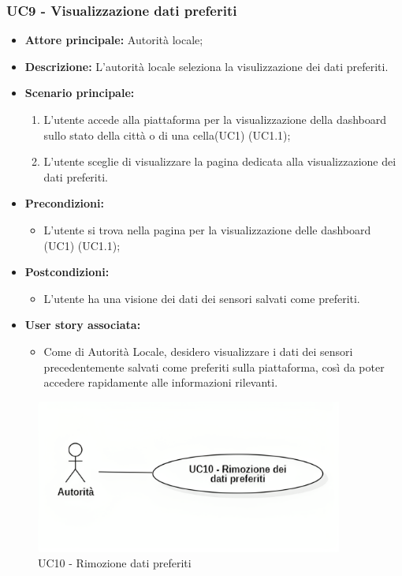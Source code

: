 \documentclass{article}
\begin{document}
\subsubsection{UC9 - Visualizzazione dati preferiti}
\begin{itemize}
    \item \textbf{Attore principale:} Autorità locale;
    \item \textbf{Descrizione:} L’autorità locale seleziona la visulizzazione dei dati preferiti.
    \item \textbf{Scenario principale:}
          \begin{enumerate}
              \item L'utente accede alla piattaforma per la visualizzazione della dashboard sullo stato della città o di una cella(UC1) (UC1.1);
              \item L'utente sceglie di visualizzare la pagina dedicata alla visualizzazione dei dati preferiti.
          \end{enumerate}
    \item \textbf{Precondizioni:}
          \begin{itemize}
              \item  L'utente si trova nella pagina per la visualizzazione delle dashboard (UC1) (UC1.1);
          \end{itemize}
    \item \textbf{Postcondizioni:}
          \begin{itemize}
              \item  L'utente ha una visione dei dati dei sensori salvati come preferiti.
          \end{itemize}
    \item \textbf{User story associata:}
          \begin{itemize}
              \item Come di Autorità Locale, desidero visualizzare i dati dei sensori precedentemente salvati come preferiti sulla piattaforma, così da poter accedere rapidamente alle informazioni rilevanti.
          \end{itemize}
\end{itemize}


\begin{figure}[H]
    \centering
    \includegraphics[width=0.9\textwidth]{Images/uc10.png}
    \caption{UC10 - Rimozione dati preferiti}
    \label{fig:UC10}
\end{figure}
\end{document}
